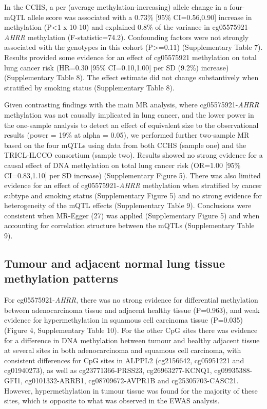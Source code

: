 \documentclass[11pt,twoside]{bristolthesis}
\begin{document}
In the CCHS, a per (average methylation-increasing) allele change in a four-mQTL allele score was associated with a 0.73\% {[}95\% CI=0.56,0.90{]} increase in methylation (P\textless1 x 10-10) and explained 0.8\% of the variance in cg05575921-\emph{AHRR} methylation (F-statistic=74.2). Confounding factors were not strongly associated with the genotypes in this cohort (P\textgreater=0.11) (Supplementary Table 7). Results provided some evidence for an effect of cg05575921 methylation on total lung cancer risk (HR=0.30 {[}95\% CI=0.10,1.00{]} per SD (9.2\%) increase) (Supplementary Table 8). The effect estimate did not change substantively when stratified by smoking status (Supplementary Table 8).

Given contrasting findings with the main MR analysis, where cg05575921-\emph{AHRR} methylation was not causally implicated in lung cancer, and the lower power in the one-sample analysis to detect an effect of equivalent size to the observational results (power = 19\% at alpha = 0.05), we performed further two-sample MR based on the four mQTLs using data from both CCHS (sample one) and the TRICL-ILCCO consortium (sample two). Results showed no strong evidence for a causal effect of DNA methylation on total lung cancer risk (OR=1.00 {[}95\% CI=0.83,1.10{]} per SD increase) (Supplementary Figure 5). There was also limited evidence for an effect of cg05575921-\emph{AHRR} methylation when stratified by cancer subtype and smoking status (Supplementary Figure 5) and no strong evidence for heterogeneity of the mQTL effects (Supplementary Table 9). Conclusions were consistent when MR-Egger (27) was applied (Supplementary Figure 5) and when accounting for correlation structure between the mQTLs (Supplementary Table 9).

\hypertarget{tumour-and-adjacent-normal-lung-tissue-methylation-patterns}{%
\subsection{Tumour and adjacent normal lung tissue methylation patterns}\label{tumour-and-adjacent-normal-lung-tissue-methylation-patterns}}

For cg05575921-\emph{AHRR}, there was no strong evidence for differential methylation between adenocarcinoma tissue and adjacent healthy tissue (P=0.963), and weak evidence for hypermethylation in squamous cell carcinoma tissue (P=0.035) (Figure 4, Supplementary Table 10). For the other CpG sites there was evidence for a difference in DNA methylation between tumour and healthy adjacent tissue at several sites in both adenocarcinoma and squamous cell carcinoma, with consistent differences for CpG sites in ALPPL2 (cg2156642, cg05951221 and cg01940273), as well as cg23771366-PRSS23, cg26963277-KCNQ1, cg09935388-GFI1, cg0101332-ARRB1, cg08709672-AVPR1B and cg25305703-CASC21. However, hypermethylation in tumour tissue was found for the majority of these sites, which is opposite to what was observed in the EWAS analysis.
\end{document}

